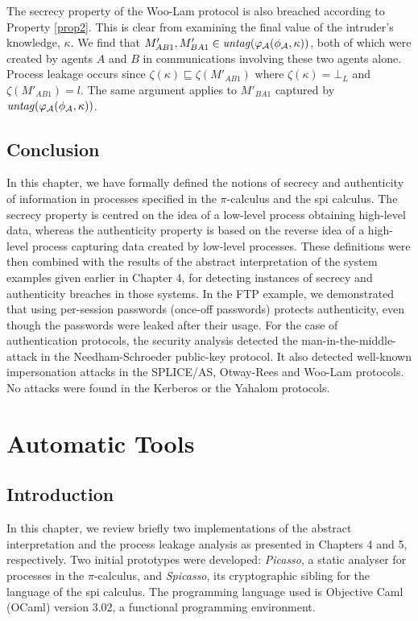 \documentclass[10pt,a4paper,final,oneside,fleqn]{book}
\begin{document}
\noindent
The secrecy property of the Woo-Lam protocol is also breached according to Property \ref{prop2}.  This is clear from examining the final value of the intruder's knowledge, $\kappa$. We find that $M'_{AB1}, M'_{BA1}\in\mbox{{\itshape untag\/}}(\varphi_\mathcal{A}(\phi_\mathcal{A},\kappa))$, both of which were created by agents $A$ and $B$ in communications involving these two agents alone. Process leakage occurs since $\zeta(\kappa)\sqsubseteq\zeta(M'_{AB1})$ where $\zeta(\kappa)=\bot_L$ and $\zeta(M'_{AB1})=l$.  The same argument applies to $M'_{BA1}$ captured by $\mbox{{\itshape untag\/}}(\varphi_\mathcal{A}(\phi_\mathcal{A},\kappa))$.
\section{Conclusion}
In this chapter, we have formally defined the notions of secrecy and authenticity of information in processes specified in the $\pi$-calculus and the spi calculus.  The secrecy property is centred on the idea of a low-level process obtaining high-level data, whereas the authenticity property is based on the reverse idea of a high-level process capturing data created by low-level processes. These definitions were then combined with the results of the abstract interpretation of the system examples given earlier in Chapter 4, for detecting instances of secrecy and authenticity breaches in those systems. In the FTP example, we demonstrated that using per-session passwords (once-off passwords) protects authenticity, even though the passwords were leaked after their usage. For the case of authentication protocols, the security analysis detected the man-in-the-middle-attack in the Needham-Schroeder public-key protocol.  It also detected well-known impersonation attacks in the SPLICE/AS, Otway-Rees and Woo-Lam protocols. No attacks were found in the Kerberos or the Yahalom protocols.
\clearpage
\chapter{Automatic Tools}
\section{Introduction}
In this chapter, we review briefly two implementations of the abstract interpretation and the process leakage analysis as presented in Chapters 4 and 5, respectively.  Two initial prototypes were developed: {\itshape Picasso\/}, a static analyser for processes in the $\pi$-calculus, and {\itshape Spicasso\/}, its cryptographic sibling for the language of the spi calculus.  The programming language used is Objective Caml (OCaml) version 3.02, a functional programming environment.
\end{document}

